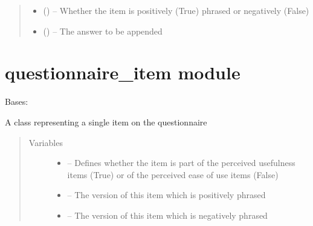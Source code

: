 \documentclass[letterpaper,10pt,english]{sphinxmanual}
\begin{document}
\begin{fulllineitems}
\begin{fulllineitems}
\begin{quote}
\begin{description}
\begin{itemize}
\item {} 
 () -- Whether the item is positively (True) phrased or negatively (False)

\item {} 
 (\href{https://docs.python.org/2/library/string.html\#module-string}{}) -- The answer to be appended

\end{itemize}

\end{description}\end{quote}

\end{fulllineitems}


\end{fulllineitems}



\chapter{questionnaire\_item module}
\label{\detokenize{questionnaire_item:questionnaire-item-module}}\label{\detokenize{questionnaire_item::doc}}\label{\detokenize{questionnaire_item:module-questionnaire_item}}

\begin{fulllineitems}
\label{\detokenize{questionnaire_item:questionnaire_item.QuestionnaireItem}}
Bases: 

A class representing a single item on the questionnaire
\begin{quote}\begin{description}
\item[{Variables}] \leavevmode\begin{itemize}
\item {} 
 -- Defines whether the item is part of the perceived usefulness items (True) or of the perceived ease of use items (False)

\item {} 
 -- The version of this item which is positively phrased

\item {} 
 -- The version of this item which is negatively phrased

\end{itemize}

\end{description}\end{quote}

\end{fulllineitems}
\end{document}
